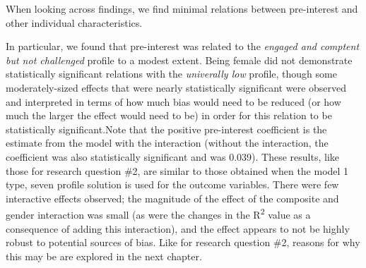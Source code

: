 \documentclass[]{msu-thesis}
\theoremstyle{definition}
\theoremstyle{definition}
\theoremstyle{definition}
\theoremstyle{remark}
\begin{document}
When looking across findings, we find minimal relations between
pre-interest and other individual characteristics.

\begin{landscape}\begin{table}

\caption{\label{tab:unnamed-chunk-16}Summary of results for Research Question 4 (how youth characteristics relate to engagement)}
\centering
{}
\end{table}
\end{landscape}

In particular, we found that pre-interest was related to the
\emph{engaged and comptent but not challenged} profile to a modest
extent. Being female did not demonstrate statistically significant
relations with the \emph{univerally low} profile, though some
moderately-sized effects that were nearly statistically significant were
observed and interpreted in terms of how much bias would need to be
reduced (or how much the larger the effect would need to be) in order
for this relation to be statistically significant.Note that the positive
pre-interest coefficient is the estimate from the model with the
interaction (without the interaction, the coefficient was also
statistically significant and was 0.039). These results, like those for
research question \#2, are similar to those obtained when the model 1
type, seven profile solution is used for the outcome variables. There
were few interactive effects observed; the magnitude of the effect of
the composite and gender interaction was small (as were the changes in
the R\textsuperscript{2} value as a consequence of adding this
interaction), and the effect appears to not be highly robust to
potential sources of bias. Like for research question \#2, reasons for
why this may be are explored in the next chapter.
\end{document}
